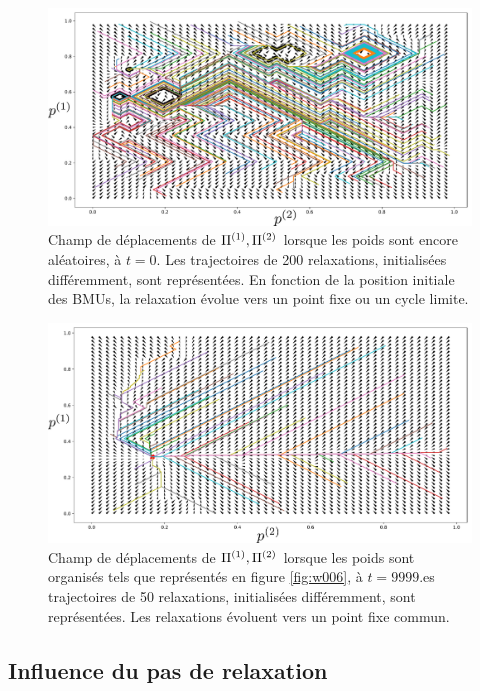 \documentclass[../main]{subfiles}
\begin{document}
\begin{figure}
\centering
\includegraphics[width=\textwidth]{champ_006_t1.pdf}
\caption{Champ de déplacements de $\Pi^{({1})},\Pi^{({2})}$ lorsque les poids sont encore aléatoires, à $t=0$. Les trajectoires de 200 relaxations, initialisées différemment, sont représentées. En fonction de la position initiale des BMUs, la relaxation évolue vers un point fixe ou un cycle limite. }
\label{fig:champ_0}
\end{figure}


\begin{figure}
\centering
\includegraphics[width=\textwidth]{champ_006.pdf}
\caption{Champ de déplacements de $\Pi^{({1})},\Pi^{({2})}$ lorsque les poids sont organisés tels que représentés en figure \ref{fig:w006}, à $t=9999$.es trajectoires de 50  relaxations, initialisées différemment, sont représentées. Les relaxations évoluent vers un point fixe commun.}
\label{fig:champ_9999}
\end{figure}

\subsection{Influence du pas de relaxation}
\end{document}
